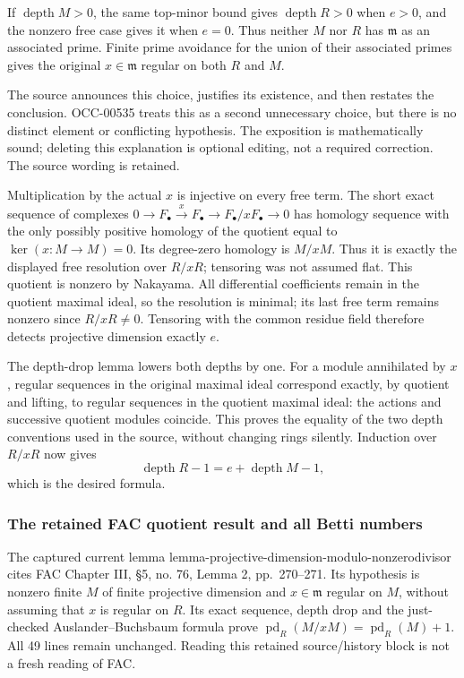 If \(\operatorname{depth}M>0\), the same top-minor bound gives \(\operatorname{depth}R>0\) when \(e>0\), and the nonzero free case gives it when \(e=0\). Thus neither \(M\) nor \(R\) has \(\mathfrak m\) as an associated prime. Finite prime avoidance for the union of their associated primes gives the original \(x\in\mathfrak m\) regular on both \(R\) and \(M\).

The source announces this choice, justifies its existence, and then restates the conclusion. OCC-00535 treats this as a second unnecessary choice, but there is no distinct element or conflicting hypothesis. The exposition is mathematically sound; deleting this explanation is optional editing, not a required correction. The source wording is retained.

Multiplication by the actual \(x\) is injective on every free term. The short exact sequence of complexes \(0\to F_\bullet\xrightarrow{x}F_\bullet\to F_\bullet/xF_\bullet\to0\) has homology sequence with the only possibly positive homology of the quotient equal to \(\ker(x:M\to M)=0\). Its degree-zero homology is \(M/xM\). Thus it is exactly the displayed free resolution over \(R/xR\); tensoring was not assumed flat. This quotient is nonzero by Nakayama. All differential coefficients remain in the quotient maximal ideal, so the resolution is minimal; its last free term remains nonzero since \(R/xR\ne0\). Tensoring with the common residue field therefore detects projective dimension exactly \(e\).

The depth-drop lemma lowers both depths by one. For a module annihilated by \(x\), regular sequences in the original maximal ideal correspond exactly, by quotient and lifting, to regular sequences in the quotient maximal ideal: the actions and successive quotient modules coincide. This proves the equality of the two depth conventions used in the source, without changing rings silently. Induction over \(R/xR\) now gives \[
\operatorname{depth}R-1=e+\operatorname{depth}M-1,
\] which is the desired formula.

\subsubsection{The retained FAC quotient result and all Betti numbers}\label{algebra-proof-023-the-retained-fac-quotient-result-and-all-betti-numbers}

The captured current lemma lemma-\AlgebraIdentifierBreak{}projective-\AlgebraIdentifierBreak{}dimension-\AlgebraIdentifierBreak{}modulo-\AlgebraIdentifierBreak{}nonzerodivis\AlgebraIdentifierBreak{}or cites FAC Chapter III, §5, no. 76, Lemma 2, pp.~270--271. Its hypothesis is nonzero finite \(M\) of finite projective dimension and \(x\in\mathfrak m\) regular on \(M\), without assuming that \(x\) is regular on \(R\). Its exact sequence, depth drop and the just-checked Auslander--Buchsbaum formula prove \(\operatorname{pd}_R(M/xM)=\operatorname{pd}_R(M)+1\). All 49 lines remain unchanged. Reading this retained source/history block is not a fresh reading of FAC.

